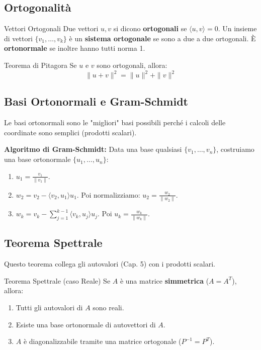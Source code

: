 \subsection{Ortogonalità}

\begin{concept}{Vettori Ortogonali}
Due vettori $u, v$ si dicono \textbf{ortogonali} se $\langle u, v \rangle = 0$.
Un insieme di vettori $\{v_1, \dots, v_k\}$ è un \textbf{sistema ortogonale} se sono a due a due ortogonali. È \textbf{ortonormale} se inoltre hanno tutti norma 1.
\end{concept}

\begin{concept}{Teorema di Pitagora}
Se $u$ e $v$ sono ortogonali, allora:
$$ \| u + v \|^2 = \| u \|^2 + \| v \|^2 $$
\end{concept}

\subsection{Basi Ortonormali e Gram-Schmidt}
Le basi ortonormali sono le "migliori" basi possibili perché i calcoli delle coordinate sono semplici (prodotti scalari).

\begin{definitionbox}
\textbf{Algoritmo di Gram-Schmidt:}
Data una base qualsiasi $\{v_1, \dots, v_n\}$, costruiamo una base ortonormale $\{u_1, \dots, u_n\}$:
\begin{enumerate}
    \item $u_1 = \frac{v_1}{\|v_1\|}$.
    \item $w_2 = v_2 - \langle v_2, u_1 \rangle u_1$. Poi normalizziamo: $u_2 = \frac{w_2}{\|w_2\|}$.
    \item $w_k = v_k - \sum_{j=1}^{k-1} \langle v_k, u_j \rangle u_{j}$. Poi $u_k = \frac{w_k}{\|w_k\|}$.
\end{enumerate}
\end{definitionbox}

\subsection{Teorema Spettrale}
Questo teorema collega gli autovalori (Cap. 5) con i prodotti scalari.

\begin{concept}{Teorema Spettrale (caso Reale)}
Se $A$ è una matrice \textbf{simmetrica} ($A = A^T$), allora:
\begin{enumerate}
    \item Tutti gli autovalori di $A$ sono reali.
    \item Esiste una base ortonormale di autovettori di $A$.
    \item $A$ è diagonalizzabile tramite una matrice ortogonale ($P^{-1} = P^T$).
\end{enumerate}
\end{concept}
